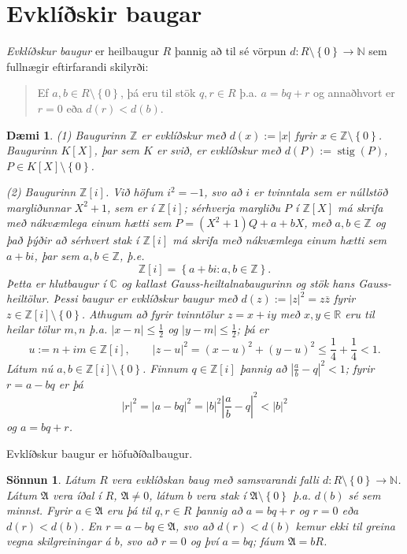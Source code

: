 \documentclass[a4paper,icelandic,11pt]{book}
\theoremstyle{plain}
\newtheorem{daemi}{Dæmi}[chapter]
\newtheorem*{sonnun}{Sönnun}
\newcommand{\R}{\mathbb{R}}
\newcommand{\N}{\mathbb{N}}
\newcommand{\Z}{\mathbb{Z}}
\newcommand{\C}{\mathbb{C}}
\DeclareMathOperator{\stig}{stig} %
\begin{document}
\section{Evklíðskir baugar}
\begin{skilgr}
  \emph{Evklíðskur baugur}
  er heilbaugur $R$ þannig að
  til sé vörpun $d:R\setminus\left\{ 0 \right\}\to\N$ sem fullnægir eftirfarandi
  skilyrði:
  \begin{quote}
    Ef $a,b\in R\setminus \left\{ 0 \right\}$, þá eru til stök $q,r\in R$ þ.a.
    $a = bq+r$ og annaðhvort er $r=0$ eða $d(r)<d(b)$.
  \end{quote}
\end{skilgr}
\begin{daemi}
  (1) Baugurinn $\Z$ er evklíðskur með $d(x):=|x|$ fyrir $x\in\Z\setminus
  \left\{ 0 \right\}$. Baugurinn $K[X]$, þar sem $K$ er svið, er evklíðskur með
  $d(P):=\stig(P)$, $P\in K[X]\setminus\left\{ 0 \right\}$.

  (2) Baugurinn $\Z[i]$. Við höfum $i^2=-1$, svo að $i$ er tvinntala sem er
  núllstöð margliðunnar $X^2+1$, sem er í $\Z[i]$; sérhverja margliðu $P$ í
  $\Z[X]$ má skrifa með nákvæmlega einum hætti sem $P=(X^2 + 1)Q+a+bX$, með
  $a,b\in\Z$ og það þýðir að sérhvert stak í $\Z[i]$ má skrifa með nákvæmlega
  einum hætti sem $a+bi$, þar sem $a,b\in\Z$, þ.e.\[
  \Z[i] = \left\{ a+bi : a,b\in\Z \right\}.
  \]
  Þetta er hlutbaugur í $\C$ og kallast
  \emph{Gauss-heiltalnabaugurinn} og stök hans
  \emph{Gauss-heiltölur}. Þessi baugur er evklíðskur
  baugur með $d(z):=|z|^2=z\overline z$ fyrir $z\in\Z[i]\setminus\left\{ 0
  \right\}$. Athugum að fyrir tvinntölur $z=x+iy$ með $x,y\in\R$ eru til heilar
  tölur $m,n$ þ.a.  $|x-n|\leq \frac 12$ og $|y-m|\leq \frac 12$; þá er\[
  u := n+im \in \Z[i],
  \qquad
  |z-u|^2 =(x-u)^2 + (y-u)^2 \leq \frac 14 + \frac 14 < 1.
  \]
  Látum nú $a,b\in \Z[i]\setminus\left\{ 0 \right\}$. Finnum $q\in\Z[i]$ þannig
  að $|\frac ab - q|^2 < 1$; fyrir $r=a-bq$ er þá 
  \[
  |r|^2=|a-bq|^2=|b|^2|\frac ab-q|^2<|b|^2
  \]
  og $a = bq+r$.
\end{daemi}
\begin{setn}
  Evklíðskur baugur er höfuðíðalbaugur.
\end{setn}
\begin{sonnun}
  Látum $R$ vera evklíðskan baug með samsvarandi falli $d:R\setminus\left\{ 0
  \right\}\to\N$. Látum $\mathfrak A$ vera íðal í $R$, $\mathfrak A\neq 0$,
  látum $b$ vera stak í $\mathfrak A\setminus\left\{ 0 \right\}$ þ.a. $d(b)$ sé
  sem minnst. Fyrir $a\in\mathfrak A$ eru þá til $q,r\in R$ þannig að $a=bq+r$
  og $r=0$ eða $d(r)<d(b)$. En $r=a-bq\in\mathfrak A$, svo að $d(r)<d(b)$ kemur
  ekki til greina vegna skilgreiningar á $b$, svo að $r=0$ og því $a=bq$; fáum
  $\mathfrak A = bR$.
\end{sonnun}
\end{document}
